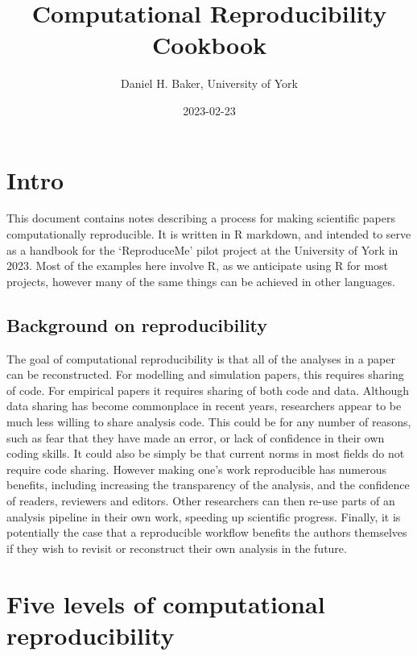 \documentclass[
]{article}
\title{Computational Reproducibility Cookbook}
\author{Daniel H. Baker, University of York}
\date{2023-02-23}
\begin{document}
\maketitle

\hypertarget{intro}{%
\section{Intro}\label{intro}}

This document contains notes describing a process for making scientific papers computationally reproducible. It is written in R markdown, and intended to serve as a handbook for the `ReproduceMe' pilot project at the University of York in 2023. Most of the examples here involve R, as we anticipate using R for most projects, however many of the same things can be achieved in other languages.

\hypertarget{background-on-reproducibility}{%
\subsection{Background on reproducibility}\label{background-on-reproducibility}}

The goal of computational reproducibility is that all of the analyses in a paper can be reconstructed. For modelling and simulation papers, this requires sharing of code. For empirical papers it requires sharing of both code and data. Although data sharing has become commonplace in recent years, researchers appear to be much less willing to share analysis code. This could be for any number of reasons, such as fear that they have made an error, or lack of confidence in their own coding skills. It could also be simply be that current norms in most fields do not require code sharing. However making one's work reproducible has numerous benefits, including increasing the transparency of the analysis, and the confidence of readers, reviewers and editors. Other researchers can then re-use parts of an analysis pipeline in their own work, speeding up scientific progress. Finally, it is potentially the case that a reproducible workflow benefits the authors themselves if they wish to revisit or reconstruct their own analysis in the future.

\hypertarget{five-levels-of-computational-reproducibility}{%
\section{Five levels of computational reproducibility}\label{five-levels-of-computational-reproducibility}}
\end{document}
